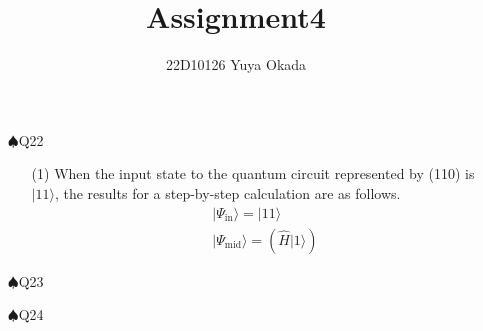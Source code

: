 \documentclass{jarticle}
\begin{document}
\title{Assignment4}
\author{22D10126 Yuya Okada}
\date{}
\maketitle

\begin{itemize}
    \item[$\spadesuit$Q22]
        \begin{enumerate}

        \item[(1)] When the input state to the quantum circuit represented by (110) is $|11\rangle$, 
        the results for a step-by-step calculation are as follows.
        \begin{align*}
            &|\Psi_{\mathrm{in}}\rangle = |11\rangle\\
            &|\Psi_{\mathrm{mid}}\rangle = \left(\hat{H}|1\rangle\right)
        \end{align*}


        

        \end{enumerate}
    \item[$\spadesuit$Q23]
    \item[$\spadesuit$Q24]  
    
\end{itemize}
\end{document}
